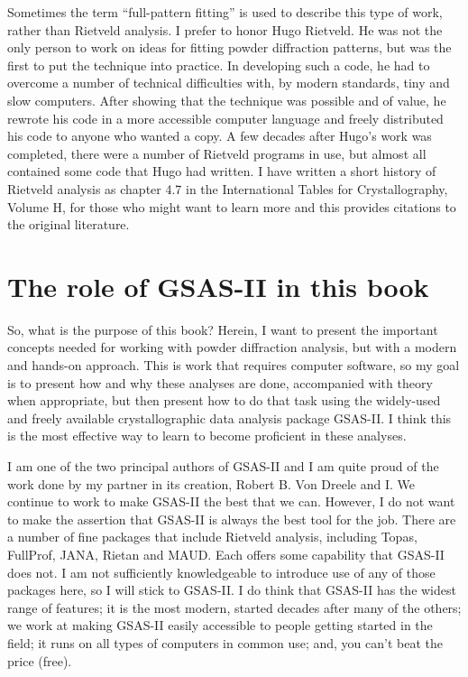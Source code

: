Sometimes the term ``full-pattern fitting'' is used to describe this type of work, rather than Rietveld analysis. I prefer to honor Hugo Rietveld. He was not the only person to work on ideas for fitting powder diffraction patterns, but was the first to put the technique into practice. In developing such a code, he had to overcome a number of technical difficulties with, by modern standards, tiny and slow computers. After showing that the technique was possible and of value, he rewrote his code in a more accessible computer language and freely distributed his code to anyone who wanted a copy. A few decades after Hugo’s work was completed, there were a number of Rietveld programs in use, but almost all contained some code that Hugo had written. I have written a short history of Rietveld analysis as chapter 4.7 in the International Tables for Crystallography, Volume H, for those who might want to learn more and this provides citations to the original literature. 

\section{The role of GSAS-II in this book} 
So, what is the purpose of this book? Herein, I want to present the important concepts needed for working with powder diffraction analysis, but with a modern and hands-on approach. This is work that requires computer software, so my goal is to present how and why these analyses are done, accompanied with theory when appropriate, but then present how to do that task using the widely-used and freely available crystallographic data analysis package GSAS-II. I think this is the most effective way to learn to become proficient in these analyses. 

I am one of the two principal authors of GSAS-II and I am quite proud of the work done by my partner in its creation, Robert B. Von Dreele and I. We continue to work to make GSAS-II the best that we can. However, I do not want to make the assertion that GSAS-II is always the best tool for the job. There are a number of fine packages that include Rietveld analysis, including Topas, FullProf, JANA, Rietan and MAUD. Each offers some capability that GSAS-II does not. I am not sufficiently knowledgeable to introduce use of any of those packages here, so I will stick to GSAS-II. I do think that GSAS-II has the widest range of features; it is the most modern, started decades after many of the others; we work at making GSAS-II easily accessible to people getting started in the field; it runs on all types of computers in common use; and, you can’t beat the price (free). 

